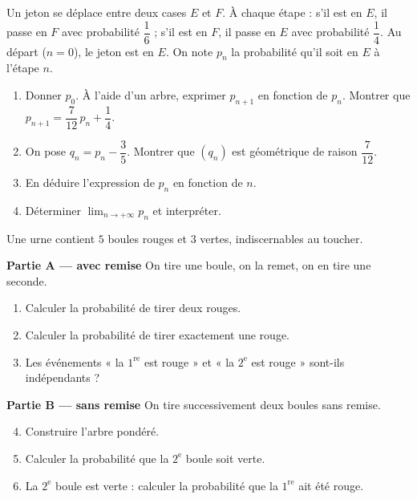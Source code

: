 Un jeton se déplace entre deux cases $E$ et $F$. À chaque étape : s'il est en
$E$, il passe en $F$ avec probabilité $\dfrac16$ ; s'il est en $F$, il passe
en $E$ avec probabilité $\dfrac14$. Au départ ($n=0$), le jeton est en $E$.
On note $p_n$ la probabilité qu'il soit en $E$ à l'étape $n$.
\begin{enumerate}
	\item Donner $p_0$. À l'aide d'un arbre, exprimer $p_{n+1}$ en fonction de
	$p_n$. Montrer que $p_{n+1}=\dfrac{7}{12}\,p_n+\dfrac14$.
	\item On pose $q_n=p_n-\dfrac{3}{5}$. Montrer que $(q_n)$ est géométrique
	de raison $\dfrac{7}{12}$.
	\item En déduire l'expression de $p_n$ en fonction de $n$.
	\item Déterminer $\displaystyle\lim_{n\to+\infty}p_n$ et interpréter.
\end{enumerate}

Une urne contient $5$ boules rouges et $3$ vertes, indiscernables au toucher.

\textbf{Partie A — avec remise}
On tire une boule, on la remet, on en tire une seconde.
\begin{enumerate}
	\item Calculer la probabilité de tirer deux rouges.
	\item Calculer la probabilité de tirer exactement une rouge.
	\item Les événements « la $1^{\text{re}}$ est rouge » et « la
	$2^{\text{e}}$ est rouge » sont-ils indépendants ?
\end{enumerate}

\textbf{Partie B — sans remise}
On tire successivement deux boules sans remise.
\begin{enumerate}
	\setcounter{enumi}{3}
	\item Construire l'arbre pondéré.
	\item Calculer la probabilité que la $2^{\text{e}}$ boule soit verte.
	\item La $2^{\text{e}}$ boule est verte : calculer la probabilité que la
	$1^{\text{re}}$ ait été rouge.
\end{enumerate}

